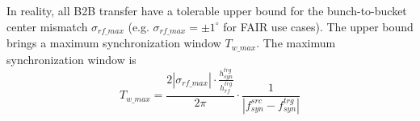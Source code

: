 
In reality, all B2B transfer have a tolerable upper bound for the bunch-to-bucket center mismatch $\sigma_\mathit{rf\_max}$ (e.g. $\sigma_\mathit{rf\_max}=\pm1^\circ$ for FAIR use cases). The upper bound brings a maximum synchronization window $T_{w\_max}$. The maximum synchronization window is 
\begin{equation}
T_{w\_max}=\frac{2|\sigma_\mathit{rf\_max}|\cdot\frac{h_\mathit{syn}^\mathit{trg}}{h_\mathit{rf}^\mathit{trg}}}{2\pi}\cdot\frac{1}{|f_{\mathit{syn}}^\mathit{src}-f_{\mathit{syn}}^\mathit{trg}|}
\end{equation}




%
%
%
%

